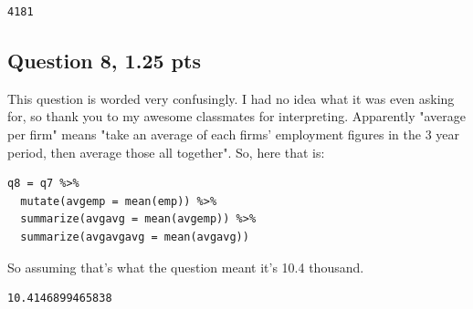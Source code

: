 \documentclass[11pt]{article}
\begin{document}
\begin{verbatim}
4181
\end{verbatim}

\subsection*{Question 8, 1.25 pts}
\label{sec:orgb0903fd}
This question is worded very confusingly.  I had no idea what it was even asking for, so thank you to my awesome classmates for interpreting.  Apparently "average per firm" means "take an average of each firms' employment figures in the 3 year period, then average those all together".  So, here that is:

\begin{verbatim}
q8 = q7 %>%
  mutate(avgemp = mean(emp)) %>%
  summarize(avgavg = mean(avgemp)) %>%
  summarize(avgavgavg = mean(avgavg))
\end{verbatim}

So assuming that's what the question meant it's 10.4 thousand.

\begin{verbatim}
10.4146899465838
\end{verbatim}
\end{document}
